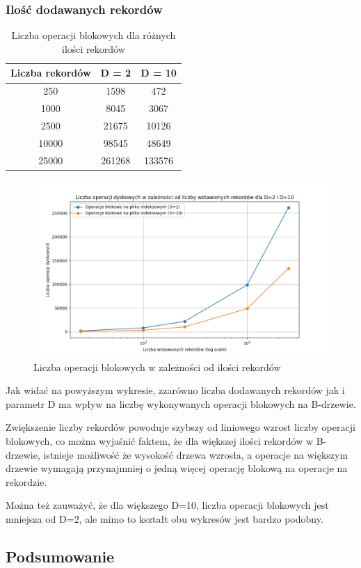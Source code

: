 \documentclass[12pt]{article}
\begin{document}
\subsubsection{Ilość dodawanych rekordów}
\begin{table}[H]
\centering
\caption{Liczba operacji blokowych dla różnych ilości rekordów}
\begin{tabular}{|c|c|c|}
\hline
Liczba rekordów & D = 2 & D = 10 \\
\hline
250 & 1598 & 472 \\
1000 & 8045 & 3067 \\
2500 & 21675 & 10126 \\
10000 & 98545 & 48649 \\
25000 & 261268 & 133576 \\
\hline
\end{tabular}
\end{table}

\begin{figure}[H]
    \centering
    \includegraphics[width=\textwidth]{../Plots/disk_operations_by_record_count.png}
    \caption{Liczba operacji blokowych w zależności od ilości rekordów}
    \label{fig:plot3}
\end{figure}

Jak widać na powyższym wykresie, zzarówno liczba dodawanych rekordów jak i parametr D ma wpływ 
na liczbę wykonywanych operacji blokowych na B-drzewie. 

Zwiększenie liczby rekordów powoduje szybszy od liniowego wzrost liczby operacji blokowych,
co można wyjaśnić faktem, że dla większej ilości rekordów w B-drzewie,
istnieje możliwość że wysokość drzewa wzrosła, a operacje na większym drzewie
wymagają przynajmniej o jedną więcej operację blokową na operacje na rekordzie.

Można też zauważyć, że dla większego D=10, liczba operacji blokowych jest mniejsza od D=2,
ale mimo to kształt obu wykresów jest bardzo podobny.


\subsection{Podsumowanie}
\end{document}
